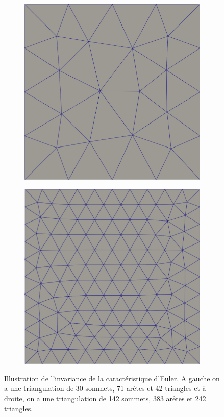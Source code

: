 \begin{figure}
\begin{subfigure}{0.5\textwidth}
    \includegraphics[width=\textwidth]{images/carre_euler_1.pdf}
\end{subfigure}
\hfill
\begin{subfigure}{0.5\textwidth}
    \includegraphics[width=\textwidth]{images/carre_euler_2.pdf}
\end{subfigure}
\caption{Illustration de l'invariance de la caractéristique d'Euler. A gauche on a une triangulation de 30 sommets, 71 arêtes et 42 triangles et à droite, on a une triangulation de 142 sommets, 383 arêtes et 242 triangles.}
\label{fig:carre_euler}
\end{figure}

